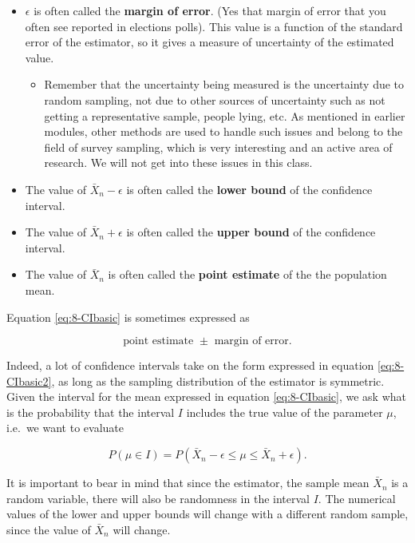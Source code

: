 \documentclass[
]{book}
\providecommand{\tightlist}{%
  \setlength{\itemsep}{0pt}\setlength{\parskip}{0pt}}
\begin{document}
\begin{itemize}
\item
  \(\epsilon\) is often called the \textbf{margin of error}. (Yes that margin of error that you often see reported in elections polls). This value is a function of the standard error of the estimator, so it gives a measure of uncertainty of the estimated value.

  \begin{itemize}
  \tightlist
  \item
    Remember that the uncertainty being measured is the uncertainty due to random sampling, not due to other sources of uncertainty such as not getting a representative sample, people lying, etc. As mentioned in earlier modules, other methods are used to handle such issues and belong to the field of survey sampling, which is very interesting and an active area of research. We will not get into these issues in this class.
  \end{itemize}
\item
  The value of \(\bar{X}_n - \epsilon\) is often called the \textbf{lower bound} of the confidence interval.
\item
  The value of \(\bar{X}_n + \epsilon\) is often called the \textbf{upper bound} of the confidence interval.
\item
  The value of \(\bar{X}_n\) is often called the \textbf{point estimate} of the the population mean.
\end{itemize}

Equation \eqref{eq:8-CIbasic} is sometimes expressed as

\begin{equation} 
\text{point estimate } \pm \text{ margin of error}.
\label{eq:8-CIbasic2}
\end{equation}

Indeed, a lot of confidence intervals take on the form expressed in equation \eqref{eq:8-CIbasic2}, as long as the sampling distribution of the estimator is symmetric. Given the interval for the mean expressed in equation \eqref{eq:8-CIbasic}, we ask what is the probability that the interval \(I\) includes the true value of the parameter \(\mu\), i.e.~we want to evaluate

\begin{equation} 
P(\mu \in  I) = P(\bar{X}_n - \epsilon \leq \mu \leq \bar{X}_n + \epsilon).
\label{eq:8-CIprob}
\end{equation}

It is important to bear in mind that since the estimator, the sample mean \(\bar{X}_n\) is a random variable, there will also be randomness in the interval \(I\). The numerical values of the lower and upper bounds will change with a different random sample, since the value of \(\bar{X}_n\) will change.
\end{document}
